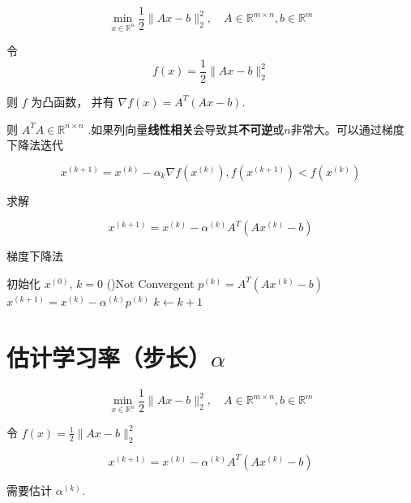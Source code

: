 \begin{definition}[梯度下降法求解最小二乘法]
    \begin{equation}
\min _{x \in \mathbb{R}^{n}} \frac{1}{2}\|A x-b\|_{2}^{2}, \quad A \in \mathbb{R}^{m \times n}, b \in \mathbb{R}^{m}
\end{equation}

令 \begin{equation} f(x)=\frac{1}{2}\|A x-b\|_{2}^{2} \end{equation}

则 $ f $ 为凸函数， 并有 $ \nabla f(x)=A^{T}(A x-b) $.

则 $ A^{T} A \in \mathbb{R}^{n \times n} $ .如果列向量\textbf{线性相关}会导致其\textbf{不可逆}或$n$非常大。可以通过梯度下降法迭代

\begin{equation}  x^{(k+1)}=x^{(k)}-\alpha_{k} \nabla f\left(x^{(k)}\right) , f\left(x^{(k+1)}\right)<f\left(x^{(k)}\right) \end{equation}

求解

\begin{equation} x^{(k+1)}=x^{(k)}-\alpha^{(k)} A^{T}\left(A x^{(k)}-b\right) \end{equation}
\end{definition}


\begin{algorithm}[htbp]
    \caption{梯度下降法}
    初始化 $ x^{(0)} $, $k=0$\;
    \While(){Not Convergent}{
        $p^{(k)}=A^{T}\left(A x^{(k)}-b\right)$\;
        $x^{(k+1)}=x^{(k)}-\alpha^{(k)} p^{(k)}$\;
        $k \leftarrow k + 1$
    }
\end{algorithm}

\section{估计学习率（步长）$\alpha$}

\begin{problem}
    \begin{equation}
    \min _{x \in \mathbb{R}^{n}} \frac{1}{2}\|A x-b\|_{2}^{2}, \quad A \in \mathbb{R}^{m \times n}, b \in \mathbb{R}^{m}
    \end{equation}
    
    令 $ f(x)=\frac{1}{2}\|A x-b\|_{2}^{2} $

    \begin{equation} x^{(k+1)}=x^{(k)}-\alpha^{(k)} A^{T}\left(A x^{(k)}-b\right) \end{equation}

    需要估计 $ \alpha^{(k)} $.
\end{problem}

